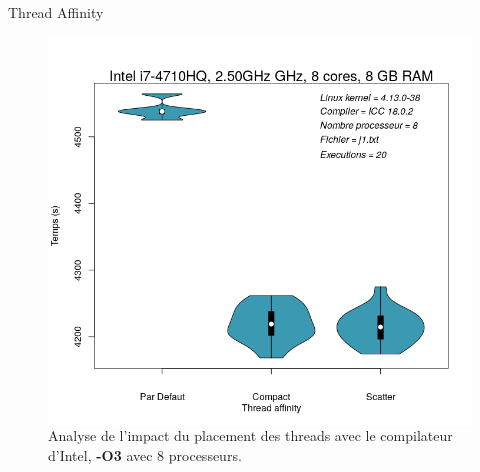 \documentclass{beamer}
\begin{document}
\begin{frame}{Thread Affinity}
	\begin{figure}
	\begin{columns}
      \caption{Analyse de l'impact du placement des threads avec le compilateur d'Intel, \textbf{-O3} avec 8 processeurs.\label{Fig:thread_affinity}}
      \includegraphics[width=\textwidth]{defaultVSscatterVScompact.png}
    \end{columns}	
	\end{figure}
\end{frame}
\end{document}
